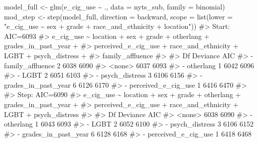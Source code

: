 \documentclass[
  letterpaper,
]{krantz}
\makeatletter
\newenvironment{Shaded}{\begin{snugshade}}{\end{snugshade}}
\newcommand{\AttributeTok}[1]{\textcolor[rgb]{0.40,0.45,0.13}{#1}}
\newcommand{\CommentTok}[1]{\textcolor[rgb]{0.37,0.37,0.37}{#1}}
\newcommand{\FunctionTok}[1]{\textcolor[rgb]{0.28,0.35,0.67}{#1}}
\newcommand{\NormalTok}[1]{\textcolor[rgb]{0.00,0.23,0.31}{#1}}
\newcommand{\OtherTok}[1]{\textcolor[rgb]{0.00,0.23,0.31}{#1}}
\newcommand{\SpecialCharTok}[1]{\textcolor[rgb]{0.37,0.37,0.37}{#1}}
\newcommand{\StringTok}[1]{\textcolor[rgb]{0.13,0.47,0.30}{#1}}
\newenvironment{kframe}{%
\medskip{}
\setlength{\fboxsep}{.8em}
 \def\at@end@of@kframe{}%
 \ifinner\ifhmode%
  \def\at@end@of@kframe{\end{minipage}}%
  \begin{minipage}{\columnwidth}%
 \fi\fi%
 \def\FrameCommand##1{\hskip\@totalleftmargin \hskip-\fboxsep
 \colorbox{shadecolor}{##1}\hskip-\fboxsep
     \hskip-\linewidth \hskip-\@totalleftmargin \hskip\columnwidth}%
 \MakeFramed {\advance\hsize-\width
   \@totalleftmargin\z@ \linewidth\hsize
   \@setminipage}}%
 {\par\unskip\endMakeFramed%
 \at@end@of@kframe}
\renewenvironment{Shaded}{\begin{kframe}}{\end{kframe}}
\makeatother
\begin{document}
\begin{Shaded}
\begin{Highlighting}[]
\NormalTok{model\_full }\OtherTok{\textless{}{-}} \FunctionTok{glm}\NormalTok{(e\_cig\_use }\SpecialCharTok{\textasciitilde{}}\NormalTok{ ., }\AttributeTok{data =}\NormalTok{ nyts\_sub, }\AttributeTok{family =}\NormalTok{ binomial)}
\NormalTok{mod\_step }\OtherTok{\textless{}{-}} \FunctionTok{step}\NormalTok{(model\_full, }\AttributeTok{direction =} \StringTok{\textquotesingle{}backward\textquotesingle{}}\NormalTok{, }
                 \AttributeTok{scope =} \FunctionTok{list}\NormalTok{(}\AttributeTok{lower =} \StringTok{"e\_cig\_use \textasciitilde{} sex + grade + }
\StringTok{                 race\_and\_ethnicity + location"}\NormalTok{))}
\CommentTok{\#\textgreater{} Start:  AIC=6093}
\CommentTok{\#\textgreater{} e\_cig\_use \textasciitilde{} location + sex + grade + otherlang + grades\_in\_past\_year + }
\CommentTok{\#\textgreater{}     perceived\_e\_cig\_use + race\_and\_ethnicity + LGBT + psych\_distress + }
\CommentTok{\#\textgreater{}     family\_affluence}
\CommentTok{\#\textgreater{} }
\CommentTok{\#\textgreater{}                       Df Deviance  AIC}
\CommentTok{\#\textgreater{} {-} family\_affluence     2     6038 6090}
\CommentTok{\#\textgreater{} \textless{}none\textgreater{}                       6037 6093}
\CommentTok{\#\textgreater{} {-} otherlang            1     6042 6096}
\CommentTok{\#\textgreater{} {-} LGBT                 2     6051 6103}
\CommentTok{\#\textgreater{} {-} psych\_distress       3     6106 6156}
\CommentTok{\#\textgreater{} {-} grades\_in\_past\_year  6     6126 6170}
\CommentTok{\#\textgreater{} {-} perceived\_e\_cig\_use  1     6416 6470}
\CommentTok{\#\textgreater{} }
\CommentTok{\#\textgreater{} Step:  AIC=6090}
\CommentTok{\#\textgreater{} e\_cig\_use \textasciitilde{} location + sex + grade + otherlang + grades\_in\_past\_year + }
\CommentTok{\#\textgreater{}     perceived\_e\_cig\_use + race\_and\_ethnicity + LGBT + psych\_distress}
\CommentTok{\#\textgreater{} }
\CommentTok{\#\textgreater{}                       Df Deviance  AIC}
\CommentTok{\#\textgreater{} \textless{}none\textgreater{}                       6038 6090}
\CommentTok{\#\textgreater{} {-} otherlang            1     6043 6093}
\CommentTok{\#\textgreater{} {-} LGBT                 2     6052 6100}
\CommentTok{\#\textgreater{} {-} psych\_distress       3     6106 6152}
\CommentTok{\#\textgreater{} {-} grades\_in\_past\_year  6     6128 6168}
\CommentTok{\#\textgreater{} {-} perceived\_e\_cig\_use  1     6418 6468}
\end{Highlighting}
\end{Shaded}
\end{document}
